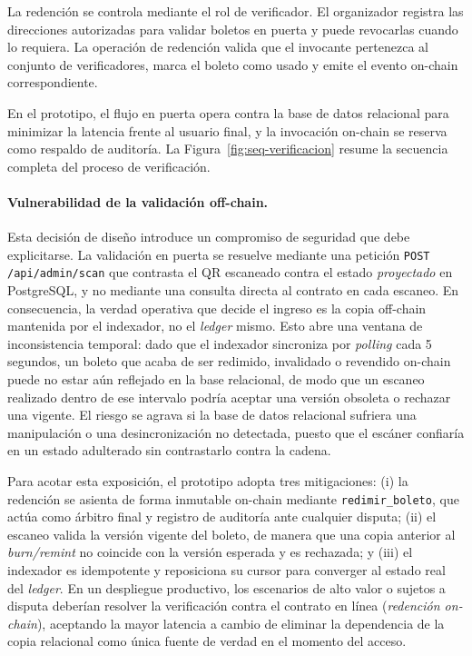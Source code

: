 La redención se controla mediante el rol de verificador. El organizador registra las direcciones autorizadas
para validar boletos en puerta y puede revocarlas cuando lo requiera. La operación de redención valida que el
invocante pertenezca al conjunto de verificadores, marca el boleto como usado y emite el evento on-chain
correspondiente.

En el prototipo, el flujo en puerta opera contra la base de datos relacional para minimizar la latencia
frente al usuario final, y la invocación on-chain se reserva como respaldo de auditoría. La
Figura~\ref{fig:seq-verificacion} resume la secuencia completa del proceso de verificación.

\paragraph{Vulnerabilidad de la validación off-chain.} Esta decisión de diseño introduce un compromiso de
seguridad que debe explicitarse. La validación en puerta se resuelve mediante una petición
\texttt{POST /api/admin/scan} que contrasta el QR escaneado contra el estado \emph{proyectado} en
PostgreSQL, y no mediante una consulta directa al contrato en cada escaneo. En consecuencia, la verdad
operativa que decide el ingreso es la copia off-chain mantenida por el indexador, no el \textit{ledger}
mismo. Esto abre una ventana de inconsistencia temporal: dado que el indexador sincroniza por
\textit{polling} cada 5 segundos, un boleto que acaba de ser redimido, invalidado o revendido on-chain
puede no estar aún reflejado en la base relacional, de modo que un escaneo realizado dentro de ese
intervalo podría aceptar una versión obsoleta o rechazar una vigente. El riesgo se agrava si la base de
datos relacional sufriera una manipulación o una desincronización no detectada, puesto que el escáner
confiaría en un estado adulterado sin contrastarlo contra la cadena.

Para acotar esta exposición, el prototipo adopta tres mitigaciones: (i) la redención se asienta de forma
inmutable on-chain mediante \texttt{redimir\_boleto}, que actúa como árbitro final y registro de auditoría
ante cualquier disputa; (ii) el escaneo valida la versión vigente del boleto, de manera que una copia
anterior al \textit{burn/remint} no coincide con la versión esperada y es rechazada; y (iii) el indexador
es idempotente y reposiciona su cursor para converger al estado real del \textit{ledger}. En un despliegue
productivo, los escenarios de alto valor o sujetos a disputa deberían resolver la verificación contra el
contrato en línea (\textit{redención on-chain}), aceptando la mayor latencia a cambio de eliminar la
dependencia de la copia relacional como única fuente de verdad en el momento del acceso.

